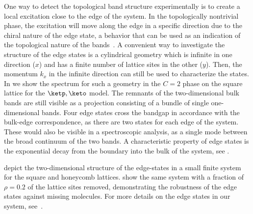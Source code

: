 
One way to detect the topological band structure experimentally is to create a local excitation close to the edge of the system.
In the topologically nontrivial phase, the excitation will move along the edge in a specific direction due to the chiral nature of the edge state, a behavior that can be used as an indication of the topological nature of the bands~\cite{Hafezi2013}.
A convenient way to investigate the structure of the edge states is a cylindrical geometry which is infinite in one direction ($x$) and has a finite number of lattice sites in the other ($y$).
Then, the momentum $k_x$ in the infinite direction can still be used to characterize the states.
In  we show the spectrum for such a geometry in the $C=2$ phase on the square lattice for the $\ketp, \keto$ model.
The remnants of the two-dimensional bulk bands are still visible as a projection consisting of a bundle of single one-dimensional bands.
Four edge states cross the bandgap in accordance with the bulk-edge correspondence, as there are two states for each edge of the system.
These would also be visible in a spectroscopic analysis, as a single mode between the broad continuum of the two bands.
A characteristic property of edge states is the exponential decay from the boundary into the bulk of the system, see .

 depict the two-dimensional structure of the edge-states in a small finite system for the square and honeycomb lattices.  show the same system with a fraction of $\rho=0.2$ of the lattice sites removed, demonstrating the robustness of the edge states against missing molecules.
For more details on the edge states in our system, see~\cite{Weber2015}.

